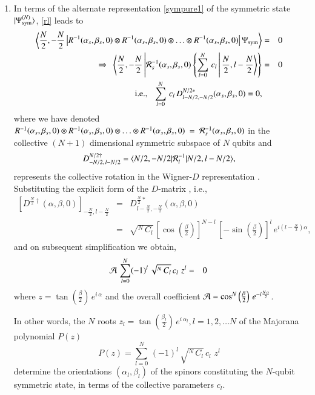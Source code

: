 {\begin{enumerate}
\item In terms of the alternate representation \eqref{sympure1} of the symmetric state $\vert \Psi^{(N)}_{\rm sym}\rangle$, \eqref{rl} leads to 
\begin{eqnarray}
\label{prelim}
\left\langle \frac{N}{2},-\frac{N}{2}\left\vert 
R^{-1}(\alpha_s,\beta_s,0)\otimes R^{-1}(\alpha_s,\beta_s,0)\otimes 
\ldots  \otimes R^{-1}(\alpha_s,\beta_s,0) \right \vert \Psi_{\rm sym}\right\rangle&=&0\nonumber \\ 
\Rightarrow\ \ \left\langle \frac{N}{2},-\frac{N}{2}\left \vert {\cal R}_s^{-1}(\alpha_s,\beta_s,0) \left\{\sum_{l=0}^N\, c_l\, \right \vert \frac{N}{2},l-\frac{N}{2}\right \rangle\right\}&=&0 \nonumber \\
{\rm i.e.,} \ \ \ \sum_{l=0}^N\, c_l\, D^{N/2*}_{l-N/2,-N/2}(\alpha_s,\beta_s,0)=0, &&
\end{eqnarray}
where we have denoted 
$R^{-1}(\alpha_s,\beta_s,0)\otimes R^{-1}(\alpha_s,\beta_s,0)\otimes 
\ldots  \otimes R^{-1}(\alpha_s,\beta_s,0)~=~{\cal R}^{-1}_s(\alpha_s,\beta_s,0)$ in the collective $(N+1)$ dimensional symmetric subspace of $N$ qubits and 
$$D^{N/2\dag}_{-N/2,\, l-N/2}=\langle N/2,-N/2\vert{\cal R}^{-1}_l 
 \vert N/2,l-N/2\rangle,$$
  represents the collective rotation   
 in the Wigner-$D$ representation \cite{Rose}. 
Substituting the explicit form of the $D$-matrix \cite{Rose}, i.e.,
\begin{eqnarray}
\label{dmatrix}
\left[D^{\frac{N}{2}\dag}(\alpha,\beta,0)\right]_{-\frac{N}{2},l-\frac{N}{2}}&=&D^{\frac{N}{2}*}_{l-\frac{N}{2},-\frac{N}{2}}(\alpha,\beta,0) \nonumber\\ 
&= & \sqrt{^N\,C_l}\, 
\left[\cos\left(\frac{\beta}{2}\right)\right]^{N-l}\, \left[-\sin\left(\frac{\beta}{2}\right)\right]^{l} \, e^{i(l-\frac{N}{2})\alpha},
\end{eqnarray}  
and on subsequent simplification we obtain,
\begin{eqnarray}
\label{cmj02}
{\cal A}\, \sum_{l=0}^N (-1)^l\,\sqrt{^N\, C_l}\,  c_l\,  \, z^{l}&=&0\,  
\end{eqnarray} 
where $z=\tan\left(\frac{\beta}{2}\right)\,e^{i\, \alpha}$ and 
the overall coefficient ${\cal A}=\cos^N\left(\frac{\beta}{2}\right)\,e^{-i\frac{N\,\alpha}{2}}$. 

In other words, 
the $N$ roots $z_l=\tan\left(\frac{\beta_l}{2}\right)\,e^{i\, \alpha_l}, l=1,2,\ldots N$ of the Majorana polynomial $P(z)$
\begin{equation} 
\label{Mp}
P(z)=\sum_{l=0}^N\, (-1)^l\, \sqrt{^N\, C_l}\,  c_l\,  \, z^{l}
\end{equation}
 determine the orientations $(\alpha_l,\beta_l)$ of the  spinors 
constituting the  $N$-qubit symmetric state, in terms of the collective parameters $c_l$.
\end{enumerate}

}

